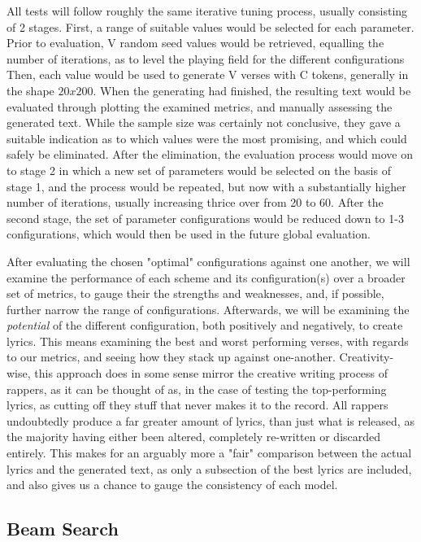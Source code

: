 All tests will follow roughly the same iterative tuning process, usually consisting of 2 stages. First, a range of suitable values would be selected for each parameter. Prior to evaluation, V random seed values would be retrieved, equalling the number of iterations, as to level the playing field for the different configurations Then, each value would be used to generate V verses with C tokens, generally in the shape $20x200$.  When the generating had finished, the resulting text would be evaluated through plotting the examined metrics, and manually assessing the generated text. While the sample size was certainly not conclusive, they gave a suitable indication as to which values were the most promising, and which could safely be eliminated. After the elimination, the evaluation process would move on to stage 2 in which a new set of parameters would be selected on the basis of stage 1, and the process would be repeated, but now with a substantially higher number of iterations, usually increasing thrice over from 20 to 60. After the second stage, the set of parameter configurations would be reduced down to 1-3 configurations, which would then be used in the future global evaluation.

After evaluating the chosen "optimal" configurations against one another, we will examine the performance of each scheme and its configuration(s) over a broader set of metrics, to gauge their the strengths and weaknesses, and, if possible, further narrow the range of configurations. Afterwards, we will be examining the \textit{potential} of the different configuration, both positively and negatively, to create lyrics. This means examining the best and worst performing verses, with regards to our metrics, and seeing how they stack up against one-another. Creativity-wise, this approach does in some sense mirror the creative writing process of rappers, as it can be thought of as, in the case of testing the top-performing lyrics, as cutting off they stuff that never makes it to the record. All rappers undoubtedly produce a far greater amount of lyrics, than just what is released, as the majority having either been altered, completely re-written or discarded entirely. This makes for an arguably more a "fair" comparison between the actual lyrics and the generated text, as only a subsection of the best lyrics are included, and also gives us a chance to gauge the consistency of each model.

\subsection{Beam Search}
\label{sec:tuningbeam}

